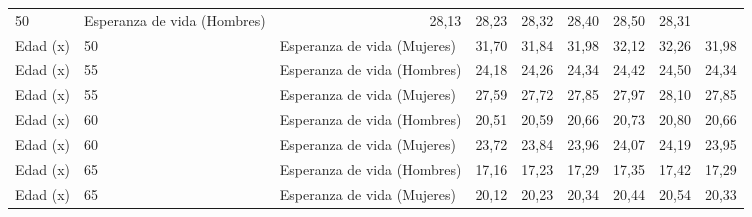 \begin{tabular}{lllllllll}
  \multicolumn{1}{l}{50} &
  \multicolumn{1}{l}{Esperanza de vida (Hombres)} &
  \multicolumn{1}{|r}{28,13} &
  \multicolumn{1}{r}{28,23} &
  \multicolumn{1}{r}{28,32} &
  \multicolumn{1}{r}{28,40} &
  \multicolumn{1}{r}{28,50} &
  \multicolumn{1}{r}{28,31} \\
\multicolumn{1}{l}{Edad (x)} &
  \multicolumn{1}{l}{50} &
  \multicolumn{1}{l}{Esperanza de vida (Mujeres)} &
  \multicolumn{1}{|r}{31,70} &
  \multicolumn{1}{r}{31,84} &
  \multicolumn{1}{r}{31,98} &
  \multicolumn{1}{r}{32,12} &
  \multicolumn{1}{r}{32,26} &
  \multicolumn{1}{r}{31,98} \\
\multicolumn{1}{l}{Edad (x)} &
  \multicolumn{1}{l}{55} &
  \multicolumn{1}{l}{Esperanza de vida (Hombres)} &
  \multicolumn{1}{|r}{24,18} &
  \multicolumn{1}{r}{24,26} &
  \multicolumn{1}{r}{24,34} &
  \multicolumn{1}{r}{24,42} &
  \multicolumn{1}{r}{24,50} &
  \multicolumn{1}{r}{24,34} \\
\multicolumn{1}{l}{Edad (x)} &
  \multicolumn{1}{l}{55} &
  \multicolumn{1}{l}{Esperanza de vida (Mujeres)} &
  \multicolumn{1}{|r}{27,59} &
  \multicolumn{1}{r}{27,72} &
  \multicolumn{1}{r}{27,85} &
  \multicolumn{1}{r}{27,97} &
  \multicolumn{1}{r}{28,10} &
  \multicolumn{1}{r}{27,85} \\
\multicolumn{1}{l}{Edad (x)} &
  \multicolumn{1}{l}{60} &
  \multicolumn{1}{l}{Esperanza de vida (Hombres)} &
  \multicolumn{1}{|r}{20,51} &
  \multicolumn{1}{r}{20,59} &
  \multicolumn{1}{r}{20,66} &
  \multicolumn{1}{r}{20,73} &
  \multicolumn{1}{r}{20,80} &
  \multicolumn{1}{r}{20,66} \\
\multicolumn{1}{l}{Edad (x)} &
  \multicolumn{1}{l}{60} &
  \multicolumn{1}{l}{Esperanza de vida (Mujeres)} &
  \multicolumn{1}{|r}{23,72} &
  \multicolumn{1}{r}{23,84} &
  \multicolumn{1}{r}{23,96} &
  \multicolumn{1}{r}{24,07} &
  \multicolumn{1}{r}{24,19} &
  \multicolumn{1}{r}{23,95} \\
\multicolumn{1}{l}{Edad (x)} &
  \multicolumn{1}{l}{65} &
  \multicolumn{1}{l}{Esperanza de vida (Hombres)} &
  \multicolumn{1}{|r}{17,16} &
  \multicolumn{1}{r}{17,23} &
  \multicolumn{1}{r}{17,29} &
  \multicolumn{1}{r}{17,35} &
  \multicolumn{1}{r}{17,42} &
  \multicolumn{1}{r}{17,29} \\
\multicolumn{1}{l}{Edad (x)} &
  \multicolumn{1}{l}{65} &
  \multicolumn{1}{l}{Esperanza de vida (Mujeres)} &
  \multicolumn{1}{|r}{20,12} &
  \multicolumn{1}{r}{20,23} &
  \multicolumn{1}{r}{20,34} &
  \multicolumn{1}{r}{20,44} &
  \multicolumn{1}{r}{20,54} &
  \multicolumn{1}{r}{20,33} \\

\end{tabular}
